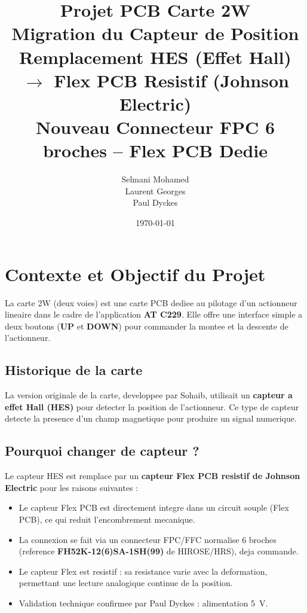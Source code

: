 \documentclass[12pt,a4paper]{article}
\title{
  \vspace{-1cm}
  \Large\textbf{Projet PCB Carte 2W}\\
  \vspace{0.3cm}
  \LARGE\textbf{Migration du Capteur de Position}\\
  \vspace{0.3cm}
  \large Remplacement HES (Effet Hall) $\rightarrow$ Flex PCB Resistif (Johnson Electric)\\
  \vspace{0.3cm}
  \normalsize Nouveau Connecteur FPC 6 broches -- Flex PCB Dedie
}
\author{Selmani Mohamed \\ Laurent Georges \\ Paul Dyckes}
\date{\today}
\begin{document}
\maketitle
\tableofcontents
\newpage

\section{Contexte et Objectif du Projet}

La carte 2W (deux voies) est une carte PCB dediee au pilotage d'un actionneur lineaire
dans le cadre de l'application \textbf{AT C229}. Elle offre une interface simple a
deux boutons (\textbf{UP} et \textbf{DOWN}) pour commander la montee et la descente
de l'actionneur.

\subsection{Historique de la carte}

La version originale de la carte, developpee par Sohaib, utilisait un \textbf{capteur
a effet Hall (HES)} pour detecter la position de l'actionneur. Ce type de capteur
detecte la presence d'un champ magnetique pour produire un signal numerique.

\subsection{Pourquoi changer de capteur ?}

Le capteur HES est remplace par un \textbf{capteur Flex PCB resistif de Johnson
Electric} pour les raisons suivantes :

\begin{itemize}
  \item Le capteur Flex PCB est directement integre dans un circuit souple (Flex PCB),
        ce qui reduit l'encombrement mecanique.
  \item La connexion se fait via un connecteur FPC/FFC normalise 6 broches (reference
        \textbf{FH52K-12(6)SA-1SH(99)} de HIROSE/HRS), deja commande.
  \item Le capteur Flex est resistif : sa resistance varie avec la deformation,
        permettant une lecture analogique continue de la position.
  \item Validation technique confirmee par Paul Dyckes : alimentation 5~V.
\end{itemize}
\end{document}
